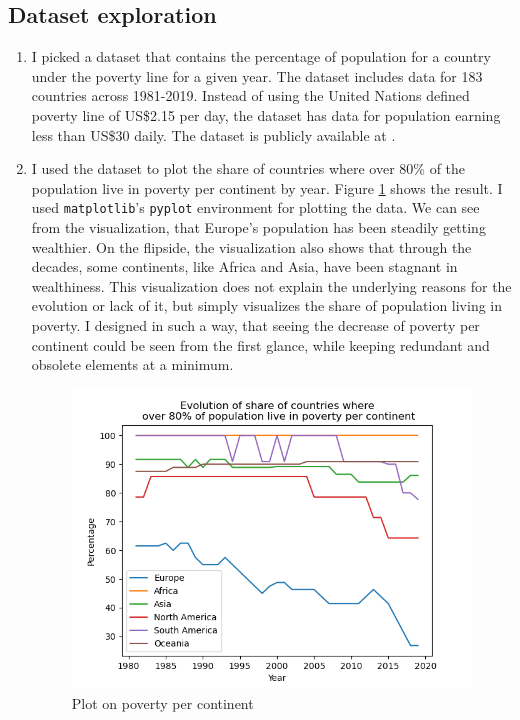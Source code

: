 \documentclass[11pt,a4paper,titlepage]{article}
\begin{document}
\subsection{Dataset exploration}
\begin{enumerate}
    \item I picked a dataset that contains the percentage of population for a country under the poverty line for a given year. The dataset includes data for 183 countries across 1981-2019. Instead of using the United Nations defined poverty line of US\$2.15 per day, the dataset has data for population earning less than US\$30 daily. The dataset is publicly available at \cite{data}.
    \item I used the dataset to plot the share of countries where over 80\% of the population live in poverty per continent by year. Figure \ref{fig:plot} shows the result. I used \texttt{matplotlib}'s \texttt{pyplot} environment for plotting the data. We can see from the visualization, that Europe's population has been steadily getting wealthier. On the flipside, the visualization also shows that through the decades, some continents, like Africa and Asia, have been stagnant in wealthiness. This visualization does not explain the underlying reasons for the evolution or lack of it, but simply visualizes the share of population living in poverty. I designed in such a way, that seeing the decrease of poverty per continent could be seen from the first glance, while keeping redundant and obsolete elements at a minimum. 

    \begin{figure}[ht]
        \centering
        \includegraphics[width=0.8\linewidth]{reports/assignment-1/imgs/plot.png}
        \caption{Plot on poverty per continent}
        \label{fig:plot}
    \end{figure}
\end{enumerate}

\newpage

\end{document}
